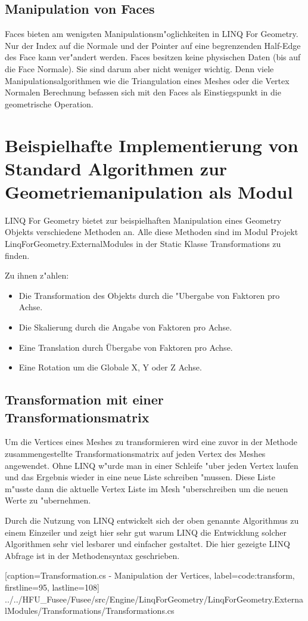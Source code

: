 \documentclass[pagesize, paper=a4, fontsize=12pt,titlepage=true, headings=small, headnosepline, abstractoff, liststotoc, nochapterprefix, plainheadsepline]{scrreprt}
\newcommand{\LFG}{LINQ For Geometry}
\newcommand{\LFGS}{LINQ For Geometry }
\begin{document}
		\subsection {Manipulation von Faces}
			Faces bieten am wenigsten Manipulationsm"oglichkeiten in \LFG. Nur der Index auf die Normale und der Pointer auf eine begrenzenden Half-Edge des Face kann ver"andert werden. Faces besitzen keine physischen Daten (bis auf die Face Normale). Sie sind darum aber nicht weniger wichtig. Denn viele Manipulationsalgorithmen wie die Triangulation eines Meshes oder die Vertex Normalen Berechnung befassen sich mit den Faces als Einstiegspunkt in die geometrische Operation.
	\section {Beispielhafte Implementierung von Standard Algorithmen zur Geometriemanipulation als Modul}
	\LFGS bietet zur beispielhaften Manipulation eines Geometry Objekts verschiedene Methoden an. Alle diese Methoden sind im Modul Projekt LinqForGeometry.ExternalModules in der Static Klasse Transformations zu finden.

Zu ihnen z"ahlen:
\begin{itemize}
\item Die Transformation des Objekts durch die "Ubergabe von Faktoren pro Achse.
\item Die Skalierung durch die Angabe von Faktoren pro Achse.
\item Eine Translation durch Übergabe von Faktoren pro Achse.
\item Eine Rotation um die Globale X, Y oder Z Achse.
\end{itemize}

\subsection {Transformation mit einer Transformationsmatrix}
Um die Vertices eines Meshes zu transformieren wird eine zuvor in der Methode zusammengestellte Transformationsmatrix auf jeden Vertex des Meshes angewendet. Ohne LINQ w"urde man in einer Schleife "uber jeden Vertex laufen und das Ergebnis wieder in eine neue Liste schreiben "mussen. Diese Liste m"usste dann die aktuelle Vertex Liste im Mesh "uberschreiben um die neuen Werte zu "ubernehmen.

Durch die Nutzung von LINQ entwickelt sich der oben genannte Algorithmus zu einem Einzeiler und zeigt hier sehr gut warum LINQ die Entwicklung solcher Algorithmen sehr viel lesbarer und einfacher gestaltet. Die hier gezeigte LINQ Abfrage ist in der Methodensyntax geschrieben.

			[caption={Transformation.cs - Manipulation der Vertices}, label=code:transform, firstline=95, lastline=108]
			{../../HFU_Fusee/Fusee/src/Engine/LinqForGeometry/LinqForGeometry.ExternalModules/Transformations/Transformations.cs}
\end{document}
